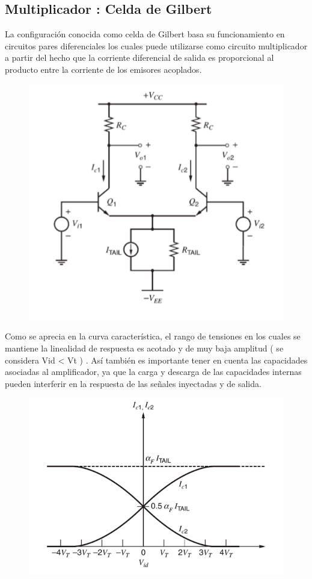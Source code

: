 \documentclass{article}
\begin{document}
{\subsection{Multiplicador : Celda de Gilbert}
La configuración conocida como celda de Gilbert basa su funcionamiento en circuitos pares diferenciales los cuales puede utilizarse como circuito multiplicador a partir del hecho que la corriente diferencial de salida es proporcional al producto entre la corriente de los emisores acoplados.
\begin{figure}[H]
  \centering
    \includegraphics[scale=0.55]{GILBERT}
  \caption{  }
\end{figure}
Como se aprecia en la curva característica, el rango de tensiones en los cuales se mantiene la linealidad de respuesta es acotado y de muy baja amplitud ( se considera Vid < Vt ) . Así también es importante tener en cuenta las capacidades asociadas al amplificador, ya que la carga y descarga de las capacidades internas pueden interferir en la respuesta de las señales inyectadas y de salida.
\begin{figure}[H]
  \centering
    \includegraphics[scale=0.55]{RTA}
  \caption{  }
\end{figure}
}
\end{document}
